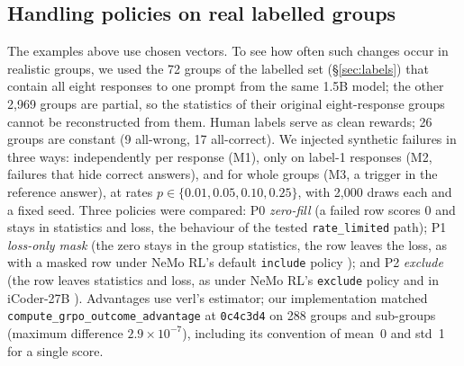 \documentclass[10pt,a4paper]{article}
\let\cite\citep
\begin{document}
\subsection{Handling policies on real labelled groups}
\label{sec:policies}
The examples above use chosen vectors. To see how often such changes occur
in realistic groups, we used the 72 groups of the labelled set
(\S\ref{sec:labels}) that contain all eight responses to one prompt from the
same 1.5B model; the other 2,969 groups are partial, so the statistics of
their original eight-response groups cannot be reconstructed from them. Human labels serve as clean rewards; 26 groups are constant
(9 all-wrong, 17 all-correct). We injected synthetic failures in three ways:
independently per response (M1), only on label-1 responses (M2, failures that
hide correct answers), and for whole groups (M3, a trigger in the reference
answer), at rates $p\in\{0.01,0.05,0.10,0.25\}$, with 2,000 draws each and a
fixed seed. Three policies were compared: P0 \emph{zero-fill} (a failed row
scores 0 and stays in statistics and loss, the behaviour of the tested
\texttt{rate\_limited} path); P1 \emph{loss-only mask} (the zero stays in
the group statistics, the row leaves the loss, as with a masked row under
NeMo RL's default \texttt{include} policy \cite{nemorl2026masked}); and P2
\emph{exclude} (the row leaves statistics and loss, as under NeMo RL's
\texttt{exclude} policy and in iCoder-27B \cite{yang2026icoder}). Advantages
use verl's estimator; our implementation matched
\texttt{compute\_grpo\_outcome\_advantage} at \texttt{0c4c3d4} on 288 groups
and sub-groups (maximum difference $2.9\times10^{-7}$), including its
convention of mean~0 and std~1 for a single score.
\end{document}
